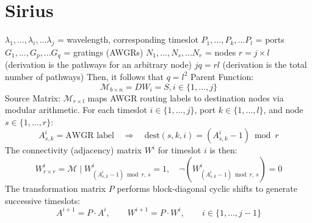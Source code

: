 \documentclass{article}
\begin{document}
    \section{Sirius}
    $\lambda_{1}, ..., \lambda_{i},...\lambda_{j}$ = wavelength, corresponding timeslot
    $P_{1}, ..., P_{k},...P_{l}$ = ports
    $G_{1}, ... , G_{p} , ... G_{q}$ = gratings (AWGRs)
    $N_{1}, ... , N_{s} , ... N_{r}$ = nodes
    $r=j \times l$ (derivation is the pathways for an arbitrary node)
    $jq=rl$ (derivation is the total number of pathways)
    Then, it follows that $q = l^{2}$
    Parent Function:
    \[
        \mathscr{M}_{b \times n}= DW_{i} = S, i \in \{1, ... ,j\}
    \]
    Source Matrix: $\mathscr{M}_{r \times l}$ maps AWGR routing labels to destination nodes via modular arithmetic. For each timeslot $i \in \{1, \ldots, j\}$, port $k \in \{1, \ldots, l\}$, and node $s \in \{1, \ldots, r\}$:
    \[
        A^{i}_{s,k} = \text{AWGR label} \quad \Rightarrow \quad \text{dest}(s,k,i) = (A^{i}_{s,k} - 1) \bmod r
    \]
    The connectivity (adjacency) matrix $W^{i}$ for timeslot $i$ is then:
    \[
        W^{i}_{r \times r} = \mathscr{M} \mid W^{i}_{(A^{i}_{s,k}-1) \bmod r,\, s} = 1, \quad \neg(W^{i}_{(A^{i}_{s,k}-1) \bmod r,\, s}) = 0
    \]
    The transformation matrix $P$ performs block-diagonal cyclic shifts to generate successive timeslots:
    \[
        A^{i+1} = P \cdot A^{i}, \qquad W^{i+1} = P \cdot W^{i}, \qquad i \in \{1, \ldots, j-1\}
    \]
\end{document}
